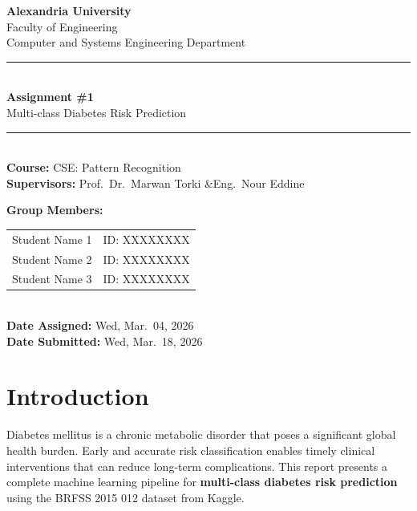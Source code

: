 \documentclass[12pt,a4paper]{article}
\begin{document}
\begin{titlepage}
    \centering
    \vspace*{1cm}
    {\Large\textbf{Alexandria University}\\[0.3em]
     \large Faculty of Engineering\\[0.2em]
     Computer and Systems Engineering Department}\\[1.5cm]
    \rule{\linewidth}{0.5mm}\\[0.4cm]
    {\LARGE\textbf{Assignment \#1}\\[0.3em]
     \Large Multi-class Diabetes Risk Prediction}\\[0.4cm]
    \rule{\linewidth}{0.5mm}\\[1.5cm]
    {\large\textbf{Course:} CSE: Pattern Recognition}\\[0.5em]
    {\large\textbf{Supervisors:} Prof.\ Dr.\ Marwan Torki \quad\&\quad Eng.\ Nour Eddine}\\[2cm]
    {\large\textbf{Group Members:}\\[0.5em]
    \begin{tabular}{ll}
        Student Name 1 & ID: XXXXXXXX \\
        Student Name 2 & ID: XXXXXXXX \\
        Student Name 3 & ID: XXXXXXXX \\
    \end{tabular}}\\[2cm]
    {\large\textbf{Date Assigned:} Wed, Mar.\ 04, 2026\\[0.3em]
           \textbf{Date Submitted:} Wed, Mar.\ 18, 2026}
    \vfill
\end{titlepage}

\tableofcontents
\newpage

\section{Introduction}

Diabetes mellitus is a chronic metabolic disorder that poses a significant global health burden. Early and accurate risk classification enables timely clinical interventions that can reduce long-term complications. This report presents a complete machine learning pipeline for \textbf{multi-class diabetes risk prediction} using the BRFSS 2015 012 dataset from Kaggle.
\end{document}
